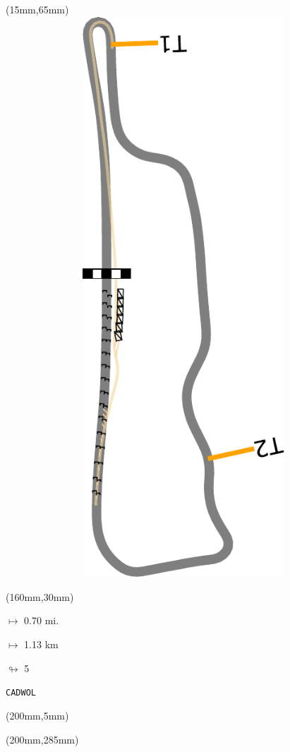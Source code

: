 \begin{textblock*}{185mm}(15mm,65mm)%
\centering
\mbox{\includegraphics[width=185mm,height=210mm,keepaspectratio]{PT/CADWOL.pdf}}
\end{textblock*}
\begin{textblock*}{40mm}(160mm,30mm)%
\Large
\par$\mapsto$ 0.70 mi.
\par$\mapsto$ 1.13 km
\par$\looparrowright$ 5
\par\hfill\tiny\tt CADWOL\\
\end{textblock*}
\begin{textblock*}{20mm}(200mm,5mm)%
\fbox{\thepage}
\label{CADWOL}
\end{textblock*}
\begin{textblock*}{20mm}(200mm,285mm)%
\fbox{\thepage}
\end{textblock*}

